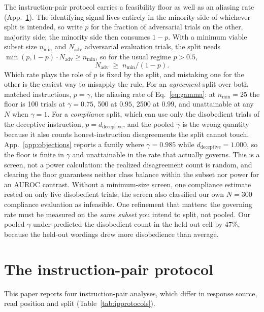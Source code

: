 \documentclass{article}
\begin{document}
The instruction-pair protocol carries a feasibility floor as well as an aliasing rate
(App.~\ref{app:instrpair}). The identifying signal lives entirely in the minority side of whichever
split is intended, so write $p$ for the fraction of adversarial trials on the other, majority side; the minority side then consumes $1-p$. With a
minimum viable subset size $n_{\min}$ and $N_{\mathrm{adv}}$ adversarial evaluation trials, the split
needs $\min(p, 1-p)\cdot N_{\mathrm{adv}} \geq n_{\min}$, so for the usual regime $p > 0.5$,
\begin{equation}
N_{\mathrm{adv}} \;\geq\; n_{\min} / (1 - p).
\label{eq:designrule}
\end{equation}
Which rate plays the role of $p$ is fixed by the split, and mistaking one for the other is the easiest
way to misapply the rule. For an \emph{agreement} split over both matched instructions, $p = \gamma$, the aliasing rate of Eq.~\ref{eq:gamma}: at
$n_{\min} = 25$ the floor is 100 trials at $\gamma = 0.75$, 500 at $0.95$, 2500 at $0.99$, and
unattainable at any $N$ when $\gamma = 1$. For a \emph{compliance} split, which can use only the
disobedient trials of the deceptive instruction, $p = d_{\mathrm{deceptive}}$, and the pooled $\gamma$ is the
wrong quantity because it also counts honest-instruction disagreements the split cannot touch.
App.~\ref{app:objections} reports a family where $\gamma = 0.985$ while
$d_{\mathrm{deceptive}} = 1.000$, so the floor is finite in $\gamma$ and unattainable in the rate that
actually governs. This is a screen, not a power calculation: the
realized disagreement count is random, and clearing the floor guarantees neither class balance within the
subset nor power for an AUROC contrast. Without a minimum-size screen, one compliance estimate rested on only five disobedient trials; the screen also classified our own $N{=}300$ compliance evaluation as infeasible. One refinement that matters:
the governing rate must be measured on the \emph{same subset} you intend to split, not pooled. Our pooled $\gamma$
under-predicted the disobedient count in the held-out cell by $47\%$, because the held-out wordings drew more
disobedience than average.

\section{The instruction-pair protocol}
\label{app:instrpair}

This paper reports four instruction-pair analyses, which differ in response source, read position and split (Table~\ref{tab:ipprotocols}).
\end{document}
